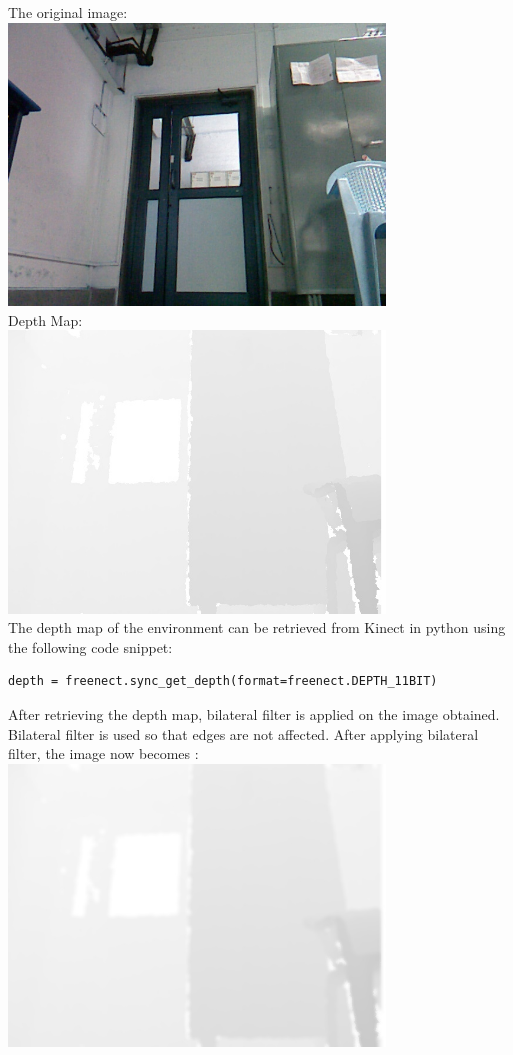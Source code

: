 \documentclass{report}
\begin{document}
The original image: \\
\includegraphics[width = 10cm]{reference.jpg} \\
Depth Map:\\
\includegraphics[width = 10cm]{feed.jpg} \\
The depth map of the environment can be retrieved from Kinect in python using the following code snippet: \\
\begin{lstlisting}
depth = freenect.sync_get_depth(format=freenect.DEPTH_11BIT)
\end{lstlisting}
After retrieving the depth map, bilateral filter is applied on the image obtained. Bilateral filter is used so that edges are not affected. After
applying bilateral filter, the image now becomes : \\
\includegraphics[width = 10cm]{bilat.jpg}
\end{document}
